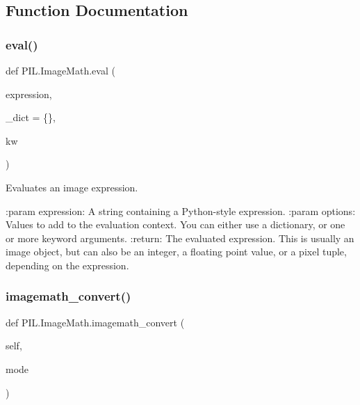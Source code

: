 \subsection{Function Documentation}
\mbox{\label{namespacePIL_1_1ImageMath_a2b820ed73b7399ea0bb00e312a2994a1}} 
\subsubsection{\texorpdfstring{eval()}{eval()}}
{\footnotesize\ttfamily def P\+I\+L.\+Image\+Math.\+eval (\begin{DoxyParamCaption}\item[{}]{expression,  }\item[{}]{\+\_\+dict = {\ttfamily \{\}},  }\item[{}]{kw }\end{DoxyParamCaption})}

\begin{DoxyVerb}Evaluates an image expression.

:param expression: A string containing a Python-style expression.
:param options: Values to add to the evaluation context.  You
                can either use a dictionary, or one or more keyword
                arguments.
:return: The evaluated expression. This is usually an image object, but can
         also be an integer, a floating point value, or a pixel tuple,
         depending on the expression.
\end{DoxyVerb}
 \mbox{\label{namespacePIL_1_1ImageMath_ae79b7f9ad3b2816809181724781efa3b}} 
\subsubsection{\texorpdfstring{imagemath\+\_\+convert()}{imagemath\_convert()}}
{\footnotesize\ttfamily def P\+I\+L.\+Image\+Math.\+imagemath\+\_\+convert (\begin{DoxyParamCaption}\item[{}]{self,  }\item[{}]{mode }\end{DoxyParamCaption})}

